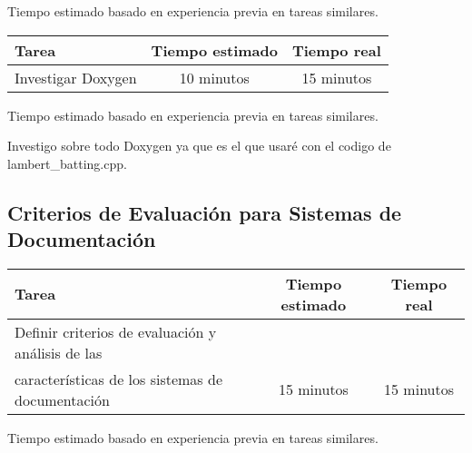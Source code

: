 \documentclass[12pt,a4paper]{article}
\begin{document}
    \begin{center}
        Tiempo estimado basado en experiencia previa en tareas similares.
    \end{center}
    \begin{center}
        \begin{tabular}{|l|c|c|}
            \hline
            \textbf{Tarea} & \textbf{Tiempo estimado} & \textbf{Tiempo real} \\
            \hline
            Investigar Doxygen & 10 minutos & 15 minutos \\
            \hline
        \end{tabular}
    \end{center}
    \begin{center}
        Tiempo estimado basado en experiencia previa en tareas similares.
    \end{center}
Investigo sobre todo Doxygen ya que es el que usaré con el codigo de lambert\_batting.cpp.

\subsection{Criterios de Evaluación para Sistemas de Documentación}
    \begin{center}
        \begin{tabular}{|l|c|c|}
            \hline
            \textbf{Tarea} & \textbf{Tiempo estimado} & \textbf{Tiempo real} \\
            \hline
            Definir criterios de evaluación y análisis de las
\\características de los sistemas de documentación & 15 minutos & 15 minutos \\
            \hline
        \end{tabular}
    \end{center}
    \begin{center}
        Tiempo estimado basado en experiencia previa en tareas similares.
    \end{center}
\end{document}
